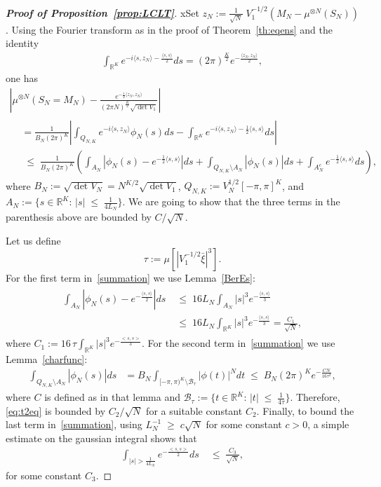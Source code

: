 \documentclass[10pt,a4paper]{article}
\renewcommand{\leq}{\;\leqslant\;}
\renewcommand{\geq}{\;\geqslant\;}
\newcommand{\scalar}[2]{\langle #1, #2\rangle}
\newcommand{\cB}{\mathcal{B}}
\newcommand{\bbR}{\mathbb{R}}
\begin{document}
\begin{proof}[{\bf Proof of Proposition~\ref{prop:LCLT}}]
xSet $z_N:=\frac1{\sqrt N} \;V_1^{-1/2}(M_N - \mu^{\otimes N}(S_N))$. Using the Fourier transform as in the proof of Theorem~\ref{th:eqens} and the identity
\begin{align}
\int_{\bbR^K}e^{-i\scalar{s}{z_N}-\frac{\scalar{s}{s}}{2}}ds = (2\pi)^{\frac{K}{2}}e^{-\frac{\scalar{z_N}{z_N}}{2}},
\end{align}
one has
\begin{multline}\label{summation}
\left |\mu^{\otimes N}\left(S_N = M_N\right)-\frac{e^{-\frac{1}{2}\scalar{z_N}{z_N}}}{(2\pi N)^{\frac{K}{2}}\sqrt{\det V_1}}\right| \\
\begin{aligned}
& = \frac{1}{B_N(2\pi)^K}\left | \int_{Q_{N,K}}e^{-i\scalar{s}{z_N}}\phi_N(s)ds-\int_{\bbR^K}e^{-i\scalar{s}{z_N}-\frac{1}{2}\scalar{s}{s}}ds\right| \\
& \leq \frac{1}{B_N(2\pi)^K}\left(\int_{A_N}\left|\phi_N(s)-e^{-\frac{1}{2}\scalar{s}{s}}\right| ds + \int_{Q_{N,K} \setminus A_N}\left|\phi_N(s)\right|ds + \int_{A_N^c}e^{-\frac{1}{2}\scalar{s}{s}}ds\right),
\end{aligned}
\end{multline}
where $B_N:=\sqrt{\det V_N}=N^{K/2}\sqrt {\det V_1}$, $Q_{N,K}:=V_N^{1/2}[-\pi,\pi]^K$, and $A_{N} := \{s\in\bbR^K:\, |s|\leq \frac{1}{4L_N}\}.$ We are going to show that the three terms in the parenthesis above are bounded by $C/\sqrt N$.

Let us define
\[
\tau:=\mu\left[\left|V_1^{-1/2}\bar{\xi}\right|^3\right].
\]
For the first term in~\eqref{summation} we use Lemma~\ref{BerEs}:
\begin{align}
\begin{split}
\int_{A_{N}}\left|\phi_N(s)-e^{-\frac{\langle s,s\rangle}{2}}\right| ds &\leq 16L_N \int_{A_{N}}|s|^3 e^{-\frac{\langle s,s\rangle}{3}}\\
&\leq16L_N \int_{\bbR^K}|s|^3 e^{-\frac{\langle s,s\rangle}{3}} = \frac{C_1}{\sqrt{N}},
\end{split}
\end{align}
where $C_1 :=16\,\tau\int_{\bbR^K}|s|^3 e^{-\frac{<s,s>}{3}}.$ For the second term in~\eqref{summation} we use Lemma~\ref{charfunc}:
\begin{align}\label{eq:t2eq}
\int_{Q_{N,K} \setminus A_{N}}\left|\phi_N(s)\right|ds &= B_N\int_{[-\pi,\pi)^K \setminus \cB_{\tau}}|\phi(t)|^N dt
\leq B_N(2\pi)^Ke^{-\frac{CN}{16\tau^2}},
\end{align}
where $C$ is defined as in that lemma and $\cB_{\tau}:= \{t\in\bbR^K:\,|t|\leq\frac{1}{4\tau}\}$. Therefore, \eqref{eq:t2eq} is bounded by $C_2/\sqrt N$ for a suitable constant $C_2$. Finally, to bound the last term in~\eqref{summation}, using $L_N^{-1}\geq c\sqrt N$ for some constant $c>0$, a simple estimate on the gaussian integral shows that
\begin{align}
\int_{|s|>\frac{1}{4L_N}}e^{-\frac{<s,s>}{2}}ds & \leq \frac{C_3}{\sqrt N},
\end{align}
for some constant $C_3$.
\end{proof}
\end{document}
